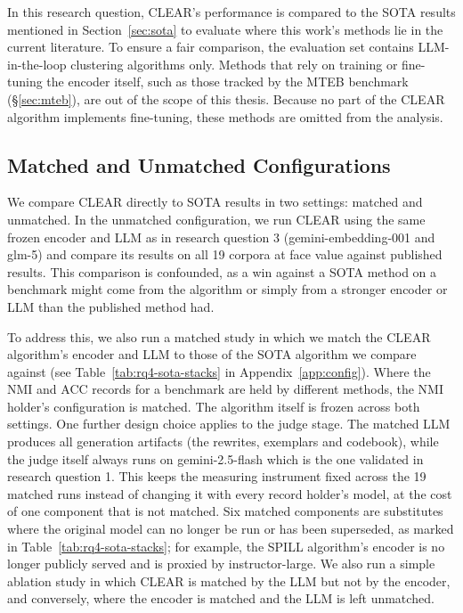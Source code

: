 \documentclass[11pt,a4paper,oneside]{report}
\begin{document}
In this research question, CLEAR's performance is compared to the SOTA results mentioned in Section~\ref{sec:sota} to evaluate where this work's methods lie in the current literature. To ensure a fair comparison, the evaluation set contains LLM-in-the-loop clustering algorithms only. Methods that rely on training or fine-tuning the encoder itself, such as those tracked by the MTEB benchmark (\S\ref{sec:mteb}), are out of the scope of this thesis. Because no part of the CLEAR algorithm implements fine-tuning, these methods are omitted from the analysis.

\subsection{Matched and Unmatched Configurations}\label{sec:matchedconfigs}

We compare CLEAR directly to SOTA results in two settings: matched and unmatched. In the unmatched configuration, we run CLEAR using the same frozen encoder and LLM as in research question 3 ({\small\ttfamily gemini-embedding-001} and {\small\ttfamily glm-5}) and compare its results on all 19 corpora at face value against published results. This comparison is confounded, as a win against a SOTA method on a benchmark might come from the algorithm or simply from a stronger encoder or LLM than the published method had.

To address this, we also run a matched study in which we match the CLEAR algorithm's encoder and LLM to those of the SOTA algorithm we compare against (see Table~\ref{tab:rq4-sota-stacks} in Appendix~\ref{app:config}). Where the NMI and ACC records for a benchmark are held by different methods, the NMI holder's configuration is matched. The algorithm itself is frozen across both settings. One further design choice applies to the judge stage. The matched LLM produces all generation artifacts (the rewrites, exemplars and codebook), while the judge itself always runs on {\small\ttfamily gemini-2.5-flash} which is the one validated in research question 1. This keeps the measuring instrument fixed across the 19 matched runs instead of changing it with every record holder's model, at the cost of one component that is not matched. Six matched components are substitutes where the original model can no longer be run or has been superseded, as marked in Table~\ref{tab:rq4-sota-stacks}; for example, the SPILL algorithm's encoder is no longer publicly served and is proxied by {\small\ttfamily instructor-large}. We also run a simple ablation study in which CLEAR is matched by the LLM but not by the encoder, and conversely, where the encoder is matched and the LLM is left unmatched.
\end{document}
